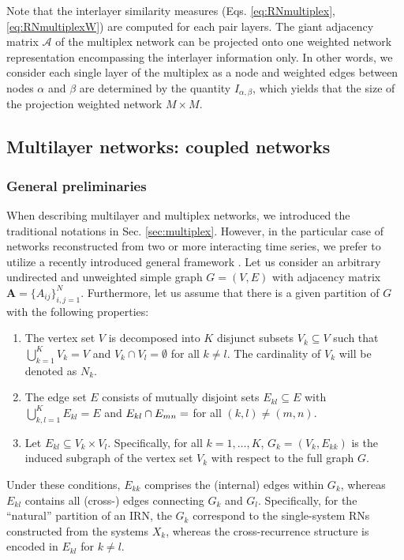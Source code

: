 		Note that the interlayer similarity measures (Eqs. \eqref{eq:RNmultiplex}, \eqref{eq:RNmultiplexW}) are computed for each pair layers. The giant adjacency matrix $\mathcal{A}$ of the multiplex network can be projected onto one weighted network representation encompassing the interlayer information only. In other words, we consider each single layer of the multiplex as a node and weighted edges between nodes $\alpha$ and $\beta$ are determined by the quantity $I_{\alpha, \beta}$, which yields that the size of the projection weighted network $M \times M$. 
		
		
	\subsection{Multilayer networks: coupled networks}
    		\subsubsection{General preliminaries}
		When describing multilayer and multiplex networks, we introduced the traditional notations in Sec. \ref{sec:multiplex}. However, in the particular case of networks reconstructed from two or more interacting time series, we prefer to utilize a recently introduced general framework \cite{Donges2011b,Wiedermann2013}. Let us consider an arbitrary undirected and unweighted simple graph $G=(V,E)$ with adjacency matrix $\textbf{A}=\{A_{ij}\}_{i,j=1}^N$. Furthermore, let us assume that there is a given partition of $G$ with the following properties:
\begin{enumerate}
\item The vertex set $V$ is decomposed into $K$ disjunct subsets $V_k \subseteq V$ such that $\bigcup_{k=1}^K V_k = V$ and $V_k \cap V_l = \emptyset$ for all $k \neq l$. The cardinality of $V_k$ will be denoted as $N_k$. 
\item The edge set $E$ consists of mutually disjoint sets $E_{kl} \subseteq E$ with $\bigcup_{k,l=1}^K E_{kl} = E$ and $E_{kl} \cap E_{mn}=\empty$ for all $(k,l) \neq (m,n)$.
\item Let $E_{kl}\subseteq V_k\times V_l$. Specifically, for all $k=1,\dots,K$, $G_k=(V_k,E_{kk})$ is the induced subgraph of the vertex set $V_k$ with respect to the full graph $G$.
\end{enumerate}
Under these conditions, $E_{kk}$ comprises the (internal) edges within $G_k$, whereas $E_{kl}$ contains all (cross-) edges connecting $G_k$ and $G_l$. Specifically, for the ``natural'' partition of an IRN, the $G_k$ correspond to the single-system RNs constructed from the systems $X_k$, whereas the cross-recurrence structure is encoded in $E_{kl}$ for $k \neq l$.

